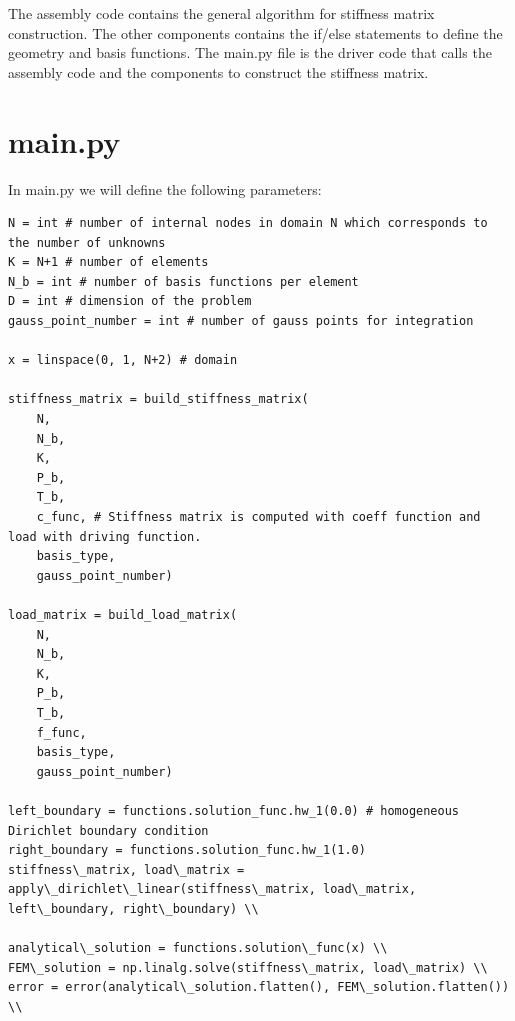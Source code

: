 \documentclass[12pt, oneside]{book}
\begin{document}
\vspace{1cm}
\vspace{1cm}

The assembly code contains the general algorithm for stiffness matrix construction. The other components contains the 
if/else statements to define the geometry and basis functions. The main.py file is the driver code that 
calls the assembly code and the components to construct the stiffness matrix.

\section{main.py}

In main.py we will define the following parameters:

\begin{lstlisting}
N = int # number of internal nodes in domain N which corresponds to the number of unknowns
K = N+1 # number of elements 
N_b = int # number of basis functions per element 
D = int # dimension of the problem 
gauss_point_number = int # number of gauss points for integration 

x = linspace(0, 1, N+2) # domain 

stiffness_matrix = build_stiffness_matrix(
    N, 
    N_b, 
    K, 
    P_b, 
    T_b, 
    c_func, # Stiffness matrix is computed with coeff function and load with driving function. 
    basis_type, 
    gauss_point_number)

load_matrix = build_load_matrix(
    N, 
    N_b,
    K,
    P_b, 
    T_b, 
    f_func, 
    basis_type, 
    gauss_point_number) 

left_boundary = functions.solution_func.hw_1(0.0) # homogeneous Dirichlet boundary condition 
right_boundary = functions.solution_func.hw_1(1.0)
stiffness\_matrix, load\_matrix = apply\_dirichlet\_linear(stiffness\_matrix, load\_matrix, left\_boundary, right\_boundary) \\

analytical\_solution = functions.solution\_func(x) \\
FEM\_solution = np.linalg.solve(stiffness\_matrix, load\_matrix) \\
error = error(analytical\_solution.flatten(), FEM\_solution.flatten()) \\
\end{lstlisting}
\end{document}
